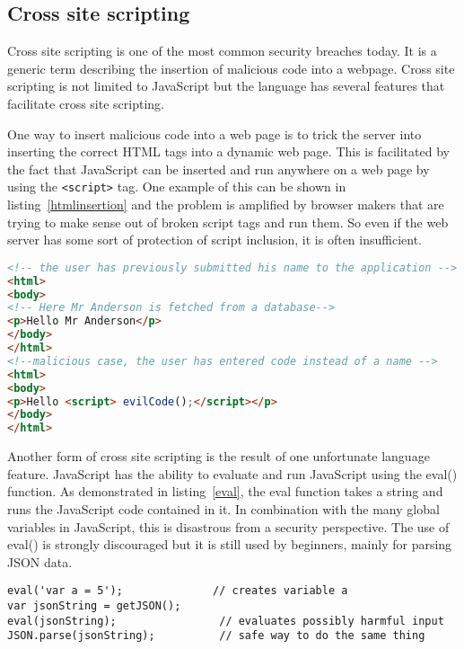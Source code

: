 \subsection{Cross site scripting}
Cross site scripting is one of the most common security breaches today. It is a generic term describing the insertion of malicious code into a webpage. Cross site scripting is not limited to JavaScript but the language has several features that facilitate cross site scripting.

One way to insert malicious code into a web page is to trick the server into inserting the correct HTML tags into a dynamic web page. This is facilitated by the fact that JavaScript can be inserted and run anywhere on a web page by using the \texttt{<script>} tag. One example of this can be shown in listing~\ref{htmlinsertion} and the problem is amplified by browser makers that are trying to make sense out of broken script tags and run them. So even if the web server has some sort of protection of script inclusion, it is often insufficient.
\begin{lstlisting}[caption={Insertion of malicious script on the server side},label={htmlinsertion},language={html}]
<!-- the user has previously submitted his name to the application -->
<html>
<body>
<!-- Here Mr Anderson is fetched from a database-->
<p>Hello Mr Anderson</p> 
</body>
</html>
<!--malicious case, the user has entered code instead of a name -->
<html>
<body>
<p>Hello <script> evilCode();</script></p>
</body>
</html>
\end{lstlisting}

Another form of cross site scripting is the result of one unfortunate language feature. JavaScript has the ability to evaluate and run JavaScript using the eval() function. As demonstrated in listing~\ref{eval}, the eval function takes a string and runs the JavaScript code contained in it. In combination with the many global variables in JavaScript, this is disastrous from a security perspective. The use of eval() is strongly discouraged but it is still used by beginners, mainly for parsing JSON data.
\begin{lstlisting}[caption={Insertion of malicious script on the client side, eval().},label={eval}]
eval('var a = 5');              // creates variable a
var jsonString = getJSON();
eval(jsonString);                // evaluates possibly harmful input
JSON.parse(jsonString);          // safe way to do the same thing
\end{lstlisting}

